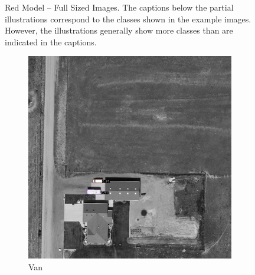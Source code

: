 \begin{figure}[h!]
    \caption[Red Model – Full Sized Images]{Red Model – Full Sized Images. The captions below the partial illustrations correspond to the classes shown in the example images. However, the illustrations generally show more classes than are indicated in the captions.}
    \label{fig:red_ablation_examples_fs}
\end{figure}

\begin{figure}[h!]
    \centering
    \begin{subfigure}[t]{0.38\textwidth}
        \centering
        \includegraphics[width=\linewidth]{images/015Results/03ablation/comp_images/green/198.png}
        \caption{Van}
    \end{subfigure}
    \begin{subfigure}[t]{0.38\textwidth}
        \centering

\end{subfigure}
\end{figure}
